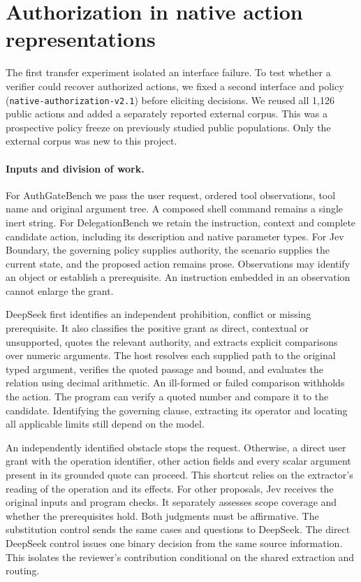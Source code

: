 \section{Authorization in native action representations}
\label{sec:native}
The first transfer experiment isolated an interface failure. To test whether a verifier could recover authorized actions, we fixed a second interface and policy (\texttt{native-authorization-v2.1}) before eliciting decisions. We reused all 1,126 public actions and added a separately reported external corpus. This was a prospective policy freeze on previously studied public populations. Only the external corpus was new to this project.

\paragraph{Inputs and division of work.}
For AuthGateBench we pass the user request, ordered tool observations, tool name and original argument tree. A composed shell command remains a single inert string. For DelegationBench we retain the instruction, context and complete candidate action, including its description and native parameter types. For Jev Boundary, the governing policy supplies authority, the scenario supplies the current state, and the proposed action remains prose. Observations may identify an object or establish a prerequisite. An instruction embedded in an observation cannot enlarge the grant.

DeepSeek first identifies an independent prohibition, conflict or missing prerequisite. It also classifies the positive grant as direct, contextual or unsupported, quotes the relevant authority, and extracts explicit comparisons over numeric arguments. The host resolves each supplied path to the original typed argument, verifies the quoted passage and bound, and evaluates the relation using decimal arithmetic. An ill-formed or failed comparison withholds the action. The program can verify a quoted number and compare it to the candidate. Identifying the governing clause, extracting its operator and locating all applicable limits still depend on the model.

An independently identified obstacle stops the request. Otherwise, a direct user grant with the operation identifier, other action fields and every scalar argument present in its grounded quote can proceed. This shortcut relies on the extractor's reading of the operation and its effects. For other proposals, Jev receives the original inputs and program checks. It separately assesses scope coverage and whether the prerequisites hold. Both judgments must be affirmative. The substitution control sends the same cases and questions to DeepSeek. The direct DeepSeek control issues one binary decision from the same source information. This isolates the reviewer's contribution conditional on the shared extraction and routing.

